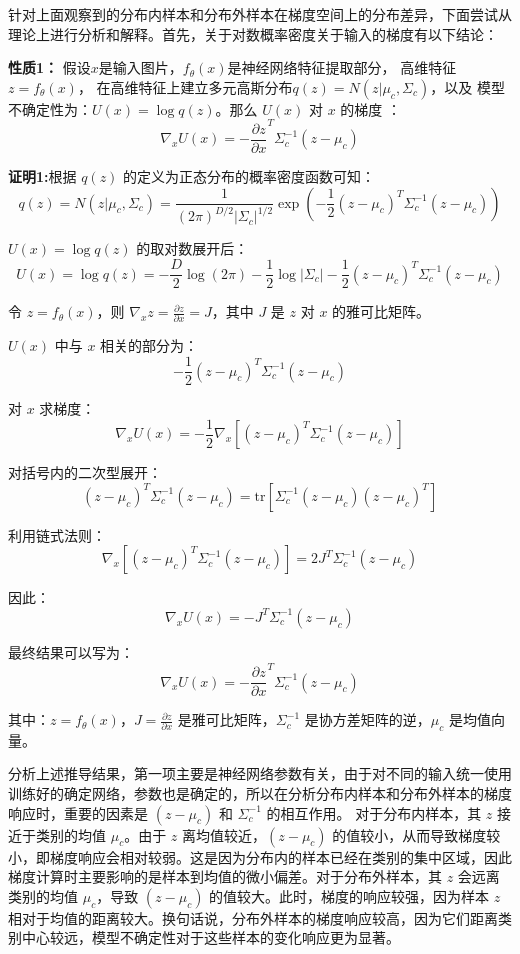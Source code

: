 针对上面观察到的分布内样本和分布外样本在梯度空间上的分布差异，下面尝试从理论上进行分析和解释。首先，关于对数概率密度关于输入的梯度有以下结论：

\textbf{性质1：}
假设$x$是输入图片，$f_\theta(x)$是神经网络特征提取部分， 高维特征\( z = f_\theta(x) \)， 在高维特征上建立多元高斯分布\( q(z) = N(z|\mu_c, \Sigma_c) \)，以及 模型不确定性为：\( U(x) = \log q(z) \)。那么 \( U(x) \) 对 \( x \) 的梯度 ：
\[
\nabla_x U(x) = - \frac{\partial z}{\partial x}^T \Sigma_c^{-1} \left( z - \mu_c \right)
\]

\textbf{证明1:}根据 \( q(z) \) 的定义为正态分布的概率密度函数可知：
\[
q(z) = N(z|\mu_c, \Sigma_c) = \frac{1}{(2\pi)^{D/2}|\Sigma_c|^{1/2}} \exp\left(-\frac{1}{2}(z - \mu_c)^T \Sigma_c^{-1} (z - \mu_c) \right)
\]


\( U(x) = \log q(z) \) 的取对数展开后：
\[
U(x) = \log q(z) = -\frac{D}{2} \log(2\pi) - \frac{1}{2} \log |\Sigma_c| - \frac{1}{2}(z - \mu_c)^T \Sigma_c^{-1} (z - \mu_c)
\]


令 \( z = f_\theta(x) \)，则 \( \nabla_x z = \frac{\partial z}{\partial x} = J \)，其中 \( J \) 是 \( z \) 对 \( x \) 的雅可比矩阵。

\( U(x) \) 中与 \( x \) 相关的部分为：
\[
-\frac{1}{2}(z - \mu_c)^T \Sigma_c^{-1} (z - \mu_c)
\]

对 \( x \) 求梯度：
\[
\nabla_x U(x) = -\frac{1}{2} \nabla_x \left[ (z - \mu_c)^T \Sigma_c^{-1} (z - \mu_c) \right]
\]

对括号内的二次型展开：
\[
(z - \mu_c)^T \Sigma_c^{-1} (z - \mu_c) = \text{tr} \left[ \Sigma_c^{-1} (z - \mu_c) (z - \mu_c)^T \right]
\]

利用链式法则：
\[
\nabla_x \left[ (z - \mu_c)^T \Sigma_c^{-1} (z - \mu_c) \right] = 2 J^T \Sigma_c^{-1} (z - \mu_c)
\]

因此：
\[
\nabla_x U(x) = -J^T \Sigma_c^{-1} (z - \mu_c)
\]

最终结果可以写为：
\[
\nabla_x U(x) = - \frac{\partial z}{\partial x}^T \Sigma_c^{-1} \left( z - \mu_c \right)
\]

其中：\( z = f_\theta(x) \)，\( J = \frac{\partial z}{\partial x} \) 是雅可比矩阵，\( \Sigma_c^{-1} \) 是协方差矩阵的逆，\( \mu_c \) 是均值向量。

分析上述推导结果，第一项主要是神经网络参数有关，由于对不同的输入统一使用训练好的确定网络，参数也是确定的，所以在分析分布内样本和分布外样本的梯度响应时，重要的因素是 \( (z - \mu_c) \) 和 \( \Sigma_c^{-1} \) 的相互作用。 对于分布内样本，其 \( z \) 接近于类别的均值 \( \mu_c \)。由于 \( z \) 离均值较近，\( (z - \mu_c) \) 的值较小，从而导致梯度较小，即梯度响应会相对较弱。这是因为分布内的样本已经在类别的集中区域，因此梯度计算时主要影响的是样本到均值的微小偏差。对于分布外样本，其 \( z \) 会远离类别的均值 \( \mu_c \)，导致 \( (z - \mu_c) \) 的值较大。此时，梯度的响应较强，因为样本 \( z \) 相对于均值的距离较大。换句话说，分布外样本的梯度响应较高，因为它们距离类别中心较远，模型不确定性对于这些样本的变化响应更为显著。


